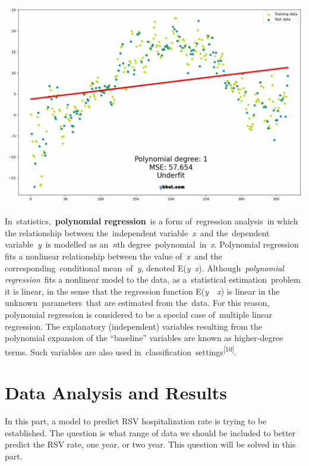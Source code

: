 \documentclass[
  letterpaper,
  DIV=11,
  numbers=noendperiod]{scrreport}
\begin{document}
\includegraphics{./images/polynomial_regression_fit.gif}

In~statistics,~\textbf{polynomial regression}~is a form of~regression
analysis~in which the relationship between the~independent
variable~\emph{x}~and the~dependent variable~\emph{y}~is modelled as
an~\emph{n}th degree~polynomial~in~\emph{x}. Polynomial regression fits
a nonlinear relationship between the value of~\emph{x}~and the
corresponding~conditional mean~of~\emph{y}, denoted
E(\emph{y}~\textbar{}\emph{x}). Although~\emph{polynomial
regression}~fits a nonlinear model to the data, as a~statistical
estimation~problem it is linear, in the sense that the regression
function E(\emph{y}~\textbar~\emph{x}) is linear in the
unknown~parameters~that are estimated from the~data. For this reason,
polynomial regression is considered to be a special case of~multiple
linear regression. The explanatory (independent) variables resulting
from the polynomial expansion of the ``baseline'' variables are known as
higher-degree terms. Such variables are also used
in~classification~settings\textsuperscript{{[}10{]}}.


\hypertarget{data-analysis-and-results}{%
\chapter{Data Analysis and Results}\label{data-analysis-and-results}}

In this part, a model to predict RSV hospitalization rate is trying to
be established. The question is what range of data we should be included
to better predict the RSV rate, one year, or two year. This question
will be solved in this part.
\end{document}
